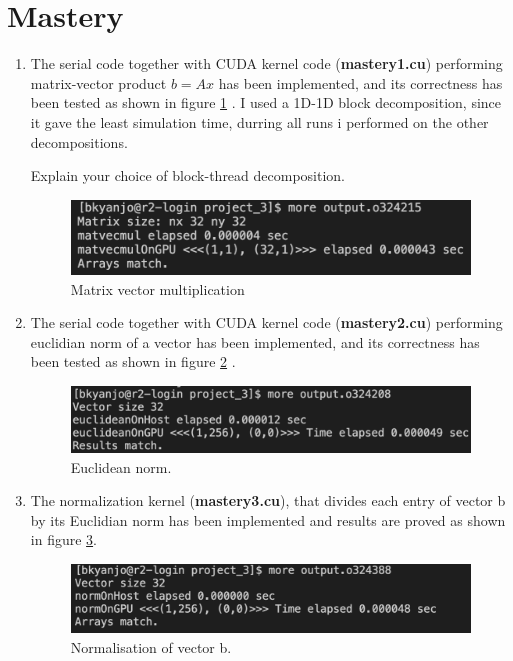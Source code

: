 \documentclass[12pt,a4paper]{article}
\begin{document}
\section*{Mastery}
\begin{enumerate}
	\item The serial code together with CUDA kernel code (\textbf{mastery\textunderscore1.cu}) performing matrix-vector product $b = Ax$ has been implemented, and its correctness has been tested as shown in figure \ref{fig:tm1} . I used a 1D-1D block decomposition, since it gave the least simulation time, durring all runs i performed on the other decompositions.
	
	Explain your choice of block-thread decomposition.
		\begin{figure}[H]
		\centering
		\includegraphics[width=0.5\linewidth]{"tm1"}
		\caption{Matrix vector multiplication}
		\label{fig:tm1}
	\end{figure}
	
	\item The serial code together with CUDA kernel code (\textbf{mastery\textunderscore2.cu}) performing euclidian norm of a vector has been implemented, and its correctness has been tested as shown in figure \ref{fig:tm2} . 
	
		\begin{figure}[H]
		\centering
		\includegraphics[width=0.5\linewidth]{"tm2"}
		\caption{Euclidean norm.}
		\label{fig:tm2}
	\end{figure}

   \item The normalization kernel (\textbf{mastery\textunderscore3.cu}), that divides each entry of vector b by its Euclidian norm has been implemented and results are proved as shown in figure \ref{fig:tm3}.

	\begin{figure}[H]
		\centering
		\includegraphics[width=0.5\linewidth]{"tm3"}
		\caption{Normalisation of vector b.}
		\label{fig:tm3}
	\end{figure}


\end{enumerate}
\end{document}
